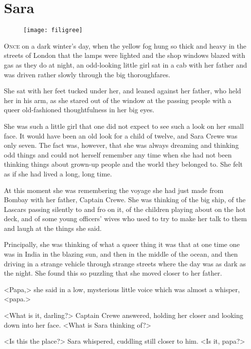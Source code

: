 \chapter{Sara}
\begin{figure}[t!]
\centering
\texttt{[image: filigree]}
\end{figure}
\lettrine[lines=5]{O}{nce} on a dark winter's day, when the yellow fog hung so thick and heavy in the streets of London that the lamps were lighted and the shop windows blazed with gas as they do at night, an odd-looking little girl sat in a cab with her father and was driven rather slowly through the big thoroughfares.

She sat with her feet tucked under her, and leaned against her father, who held her in his arm, as she stared out of the window at the passing people with a queer old-fashioned thoughtfulness in her big eyes.

She was such a little girl that one did not expect to see such a look on her small face. It would have been an old look for a child of twelve, and Sara Crewe was only seven. The fact was, however, that she was always dreaming and thinking odd things and could not herself remember any time when she had not been thinking things about grown-up people and the world they belonged to. She felt as if she had lived a long, long time.

At this moment she was remembering the voyage she had just made from Bombay with her father, Captain Crewe. She was thinking of the big ship, of the Lascars passing silently to and fro on it, of the children playing about on the hot deck, and of some young officers' wives who used to try to make her talk to them and laugh at the things she said.

Principally, she was thinking of what a queer thing it was that at one time one was in India in the blazing sun, and then in the middle of the ocean, and then driving in a strange vehicle through strange streets where the day was as dark as the night. She found this so puzzling that she moved closer to her father.

<Papa,> she said in a low, mysterious little voice which was almost a whisper, <papa.>

<What is it, darling?> Captain Crewe answered, holding her closer and looking down into her face. <What is Sara thinking of?>

<Is this the place?> Sara whispered, cuddling still closer to him. <Is it, papa?>


